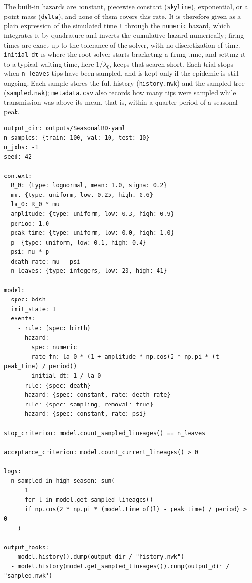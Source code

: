 \documentclass[11pt]{article}
\begin{document}
The built-in hazards are constant, piecewise constant (\texttt{skyline}),
exponential, or a point mass (\texttt{delta}), and none of them covers this
rate. It is therefore given as a plain expression of the simulated time
\texttt{t} through the \texttt{numeric} hazard, which integrates it by
quadrature and inverts the cumulative hazard numerically; firing times are exact
up to the tolerance of the solver, with no discretization of time.
\texttt{initial\_dt} is where the root solver starts bracketing a firing time,
and setting it to a typical waiting time, here $1/\lambda_0$, keeps that search
short. Each trial stops when \texttt{n\_leaves} tips have been sampled, and is
kept only if the epidemic is still ongoing. Each sample stores the full history
(\texttt{history.nwk}) and the sampled tree (\texttt{sampled.nwk});
\texttt{metadata.csv} also records how many tips were sampled while transmission
was above its mean, that is, within a quarter period of a seasonal peak.

\begin{lstlisting}[style=cfg]
output_dir: outputs/SeasonalBD-yaml
n_samples: {train: 100, val: 10, test: 10}
n_jobs: -1
seed: 42

context:
  R_0: {type: lognormal, mean: 1.0, sigma: 0.2}
  mu: {type: uniform, low: 0.25, high: 0.6}
  la_0: R_0 * mu
  amplitude: {type: uniform, low: 0.3, high: 0.9}
  period: 1.0
  peak_time: {type: uniform, low: 0.0, high: 1.0}
  p: {type: uniform, low: 0.1, high: 0.4}
  psi: mu * p
  death_rate: mu - psi
  n_leaves: {type: integers, low: 20, high: 41}

model:
  spec: bdsh
  init_state: I
  events:
    - rule: {spec: birth}
      hazard:
        spec: numeric
        rate_fn: la_0 * (1 + amplitude * np.cos(2 * np.pi * (t - peak_time) / period))
        initial_dt: 1 / la_0
    - rule: {spec: death}
      hazard: {spec: constant, rate: death_rate}
    - rule: {spec: sampling, removal: true}
      hazard: {spec: constant, rate: psi}

stop_criterion: model.count_sampled_lineages() == n_leaves

acceptance_criterion: model.count_current_lineages() > 0

logs:
  n_sampled_in_high_season: sum(
      1
      for l in model.get_sampled_lineages()
      if np.cos(2 * np.pi * (model.time_of(l) - peak_time) / period) > 0
    )

output_hooks:
  - model.history().dump(output_dir / "history.nwk")
  - model.history(model.get_sampled_lineages()).dump(output_dir / "sampled.nwk")
\end{lstlisting}
\end{document}
